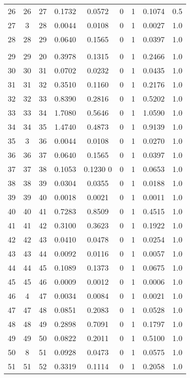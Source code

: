 \begin{longtable}{ccccccccc}
	26 & 26 & 27 & 0.1732 & 0.0572 & 0 & 1 & 0.1074 & 0.5 \\
	27 & 3 & 28 & 0.0044 & 0.0108 & 0 & 1 & 0.0027 & 1.0 \\
	28 & 28 & 29 & 0.0640 & 0.1565 & 0 & 1 & 0.0397 & 1.0 \\
	\toprule \\
	\hline
	29 & 29 & 20 & 0.3978 & 0.1315 & 0 & 1 & 0.2466 & 1.0 \\
	30 & 30 & 31 & 0.0702 & 0.0232 & 0 & 1 & 0.0435 & 1.0 \\
	31 & 31 & 32 & 0.3510 & 0.1160 & 0 & 1 & 0.2176 & 1.0 \\
	32 & 32 & 33 & 0.8390 & 0.2816 & 0 & 1 & 0.5202 & 1.0 \\
	33 & 33 & 34 & 1.7080 & 0.5646 & 0 & 1 & 1.0590 & 1.0 \\
	34 & 34 & 35 & 1.4740 & 0.4873 & 0 & 1 & 0.9139 & 1.0 \\
	35 & 3 & 36 & 0.0044 & 0.0108 & 0 & 1 & 0.0270 & 1.0 \\
	36 & 36 & 37 & 0.0640 & 0.1565 & 0 & 1 & 0.0397 & 1.0 \\
	37 & 37 & 38 & 0.1053 & 0.1230 0& 0 & 1 & 0.0653 & 1.0 \\
	38 & 38 & 39 & 0.0304 & 0.0355 & 0 & 1 & 0.0188 & 1.0\\
	39 & 39 & 40 & 0.0018 & 0.0021 & 0 & 1 & 0.0011 & 1.0 \\
	40 & 40 & 41 & 0.7283 & 0.8509 & 0 & 1 & 0.4515 & 1.0 \\
	41 & 41 & 42 & 0.3100 & 0.3623 & 0 & 1 & 0.1922 & 1.0 \\
	42 & 42 & 43 & 0.0410 & 0.0478 & 0 & 1 & 0.0254 & 1.0 \\ 
	43 & 43 & 44 & 0.0092 & 0.0116 & 0 & 1 & 0.0057 & 1.0 \\
	44 & 44 & 45 & 0.1089 & 0.1373 & 0 & 1 & 0.0675 & 1.0 \\
	45 & 45 & 46 & 0.0009 & 0.0012 & 0 & 1 & 0.0006 & 1.0 \\
	46 & 4 & 47 & 0.0034 & 0.0084 & 0 & 1 & 0.0021 & 1.0 \\
	47 & 47 & 48 & 0.0851 & 0.2083 & 0 & 1 & 0.0528 & 1.0 \\
	48 & 48 & 49 & 0.2898 & 0.7091 & 0 & 1 & 0.1797 & 1.0 \\
	49 & 49 & 50 & 0.0822 & 0.2011 & 0 & 1 & 0.5100 & 1.0 \\
	50 & 8 & 51 & 0.0928 & 0.0473 & 0 & 1 & 0.0575 & 1.0 \\
	51 & 51 & 52 & 0.3319 & 0.1114 & 0 & 1 & 0.2058 & 1.0 \\

\end{longtable}
